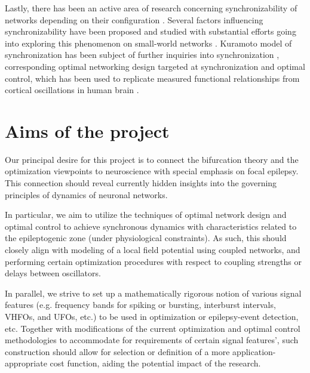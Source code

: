 \documentclass[a4paper,11pt]{scrartcl}
\begin{document}
Lastly, there has been an active area of research concerning synchronizability of networks depending on their configuration \cite{Hong2004, Nishikawa2003}. Several factors influencing synchronizability have been proposed and studied with substantial efforts going into exploring this phenomenon on small-world networks \cite{Hong2002, Hong2002-1}. Kuramoto model of synchronization \cite{Kuramoto1984} has been subject of further inquiries into synchronization \cite{Hong2011}, corresponding optimal networking design targeted at synchronization \cite{Fazlyab2017, Nishikawa2006} and optimal control, which has been used to replicate measured functional relationships from cortical oscillations in human brain \cite{Menara2022}.


\section{Aims of the project}\label{sec:aims}

Our principal desire for this project is to connect the bifurcation theory and the optimization viewpoints to neuroscience with special emphasis on focal epilepsy. This connection should reveal currently hidden insights into the governing principles of dynamics of neuronal networks.

In particular, we aim to utilize the techniques of optimal network design \cite{Motter2007} and optimal control \cite{Agrachev2023, Baggio2021} to achieve synchronous dynamics with characteristics related to the epileptogenic zone (under physiological constraints). As such, this should closely align with modeling of a local field potential using coupled networks, and performing certain optimization procedures with respect to coupling strengths or delays between oscillators. 

In parallel, we strive to set up a mathematically rigorous notion of various signal features (e.g. frequency bands for spiking or bursting, interburst intervals, VHFOs, and UFOs, etc.) \cite{Wedler2022, Srivastava2016} to be used in optimization or epilepsy-event detection, etc. Together with modifications of the current optimization and optimal control methodologies to accommodate for requirements of certain signal features', such construction should allow for selection or definition of a more application-appropriate cost function, aiding the potential impact of the research.
\end{document}
